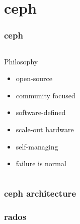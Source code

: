 \documentclass[10pt, compress]{beamer}
\begin{document}
\section{ceph}
\begin{frame}[fragile]
  \frametitle{ceph}
    \begin{columns}
            \begin{block}{Philosophy}
                \begin{itemize}[<+->]
                \item open-source
                \item community focused
                \item software-defined
                \item scale-out hardware
                \item self-managing
                \item failure is normal
                \end{itemize}
            \end{block}
    \end{columns}
\end{frame}

\begin{frame}[fragile]
    \frametitle{ceph architecture}
    \begin{center}
    \end{center}
\end{frame}

\begin{frame}[fragile]
    \frametitle{rados}
    \begin{center}
        
    \end{center}
\end{frame}
\end{document}
